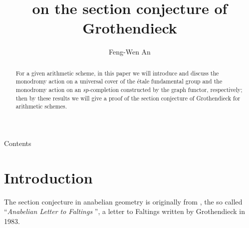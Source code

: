 \documentclass[12pt,twoside,reqno]{amsart}
\theoremstyle{definition}
\numberwithin{equation}{section}
\begin{document}
\title{on the section conjecture of Grothendieck}
\author{Feng-Wen An}
\address{School of Mathematics and Statistics, Wuhan University, Wuhan,
Hubei 430072, People's Republic of China}

\begin{abstract}
For a given arithmetic scheme, in this paper we will introduce and discuss the monodromy action on a universal cover of the \'{e}tale fundamental group and the monodromy action on an \emph{sp}-completion constructed by the graph functor, respectively;  then by these results we will give a proof of the section conjecture of Grothendieck for arithmetic schemes.
\end{abstract}

\maketitle

\begin{center}
{\tiny {Contents} }
\end{center}

{\tiny {} }

{\tiny {} }

{\tiny {} }

{\tiny {}}

{\tiny {}}

{\tiny {}}

{\tiny {}}

{\tiny {}}

{\tiny {}}

{\tiny {}}



\section*{Introduction}

The section conjecture in anabelian geometry is originally from \cite{faltings}, the so called \textquotedblleft \emph{Anabelian Letter to Faltings} \textquotedblright, a letter to Faltings written by Grothendieck in 1983.
\end{document}
